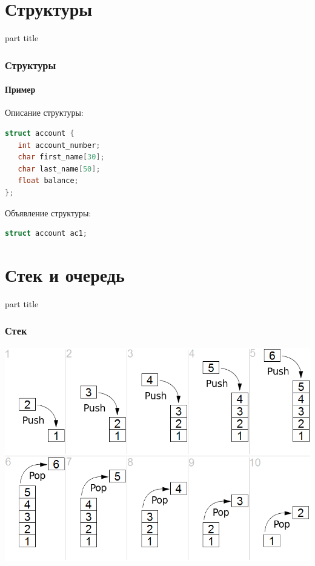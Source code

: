 \documentclass[14pt,pdf,hyperref={unicode}]{beamer}
\begin{document}
\section{Структуры}
\begin{frame}
\begin{center}
\begin{beamercolorbox}[sep=8pt,center]{part
title}
\insertsection
\end{beamercolorbox}
\end{center}
\end{frame}



\begin{frame}[fragile]
\frametitle{Структуры} 
\framesubtitle{Пример} 
Описание структуры:
\begin{lstlisting}[language=C++,basicstyle=\ttfamily,keywordstyle=\color{blue}]
struct account {
   int account_number;
   char first_name[30];
   char last_name[50];
   float balance;
};
\end{lstlisting}
Объявление структуры:
\begin{lstlisting}[language=C++,basicstyle=\ttfamily,keywordstyle=\color{blue}]
struct account ac1;
\end{lstlisting}
\end{frame}





\section{Стек и очередь}
\begin{frame}
\begin{center}
\begin{beamercolorbox}[sep=8pt,center]{part
title}
\insertsection
\end{beamercolorbox}
\end{center}
\end{frame}



\begin{frame}[fragile]
\frametitle{Стек} 
\begin{center}
\includegraphics[width=0.8\linewidth]{images/Lifo_stack.png}
\end{center}
\end{frame}
\end{document}
